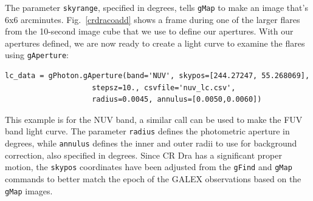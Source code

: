 \documentclass[preprint]{aastex}
\begin{document}
The parameter \texttt{skyrange}, specified in degrees, tells \texttt{gMap} to make an image that's 6x6 arcminutes.  Fig.\ \ref{crdracoadd} shows a frame during one of the larger flares from the 10-second image cube that we use to define our apertures.  With our apertures defined, we are now ready to create a light curve to examine the flares using \texttt{gAperture}:

\begin{verbatim}
lc_data = gPhoton.gAperture(band='NUV', skypos=[244.27247, 55.268069],
                    stepsz=10., csvfile='nuv_lc.csv',
                    radius=0.0045, annulus=[0.0050,0.0060])
\end{verbatim}

This example is for the NUV band, a similar call can be used to make the FUV band light curve.  The parameter \texttt{radius} defines the photometric aperture in degrees, while \texttt{annulus} defines the inner and outer radii to use for background correction, also specified in degrees.  Since CR Dra has a significant proper motion, the \texttt{skypos} coordinates have been adjusted from the \texttt{gFind} and \texttt{gMap} commands to better match the epoch of the GALEX observations based on the \texttt{gMap} images.
\end{document}
